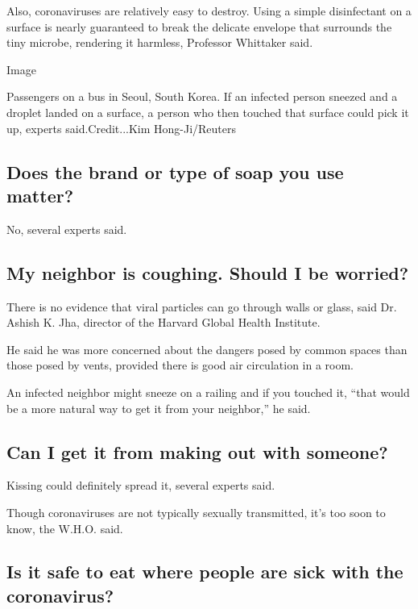 Also, coronaviruses are relatively easy to destroy. Using a simple
disinfectant on a surface is nearly guaranteed to break the delicate
envelope that surrounds the tiny microbe, rendering it harmless,
Professor Whittaker said.

Image

Passengers on a bus in Seoul, South Korea. If an infected person sneezed
and a droplet landed on a surface, a person who then touched that
surface could pick it up, experts said.Credit...Kim Hong-Ji/Reuters

\hypertarget{does-the-brand-or-type-of-soap-you-use-matter}{%
\subsection{Does the brand or type of soap you use
matter?}\label{does-the-brand-or-type-of-soap-you-use-matter}}

No, several experts said.

\hypertarget{my-neighbor-is-coughing-should-i-be-worried}{%
\subsection{My neighbor is coughing. Should I be
worried?}\label{my-neighbor-is-coughing-should-i-be-worried}}

There is no evidence that viral particles can go through walls or glass,
said Dr. Ashish K. Jha, director of the Harvard Global Health Institute.

He said he was more concerned about the dangers posed by common spaces
than those posed by vents, provided there is good air circulation in a
room.

An infected neighbor might sneeze on a railing and if you touched it,
``that would be a more natural way to get it from your neighbor,'' he
said.

\hypertarget{can-i-get-it-from-making-out-with-someone}{%
\subsection{Can I get it from making out with
someone?}\label{can-i-get-it-from-making-out-with-someone}}

Kissing could definitely spread it, several experts said.

Though coronaviruses are not typically sexually transmitted, it's too
soon to know, the W.H.O. said.

\hypertarget{is-it-safe-to-eat-where-people-are-sick-with-the-coronavirus}{%
\subsection{Is it safe to eat where people are sick with the
coronavirus?}\label{is-it-safe-to-eat-where-people-are-sick-with-the-coronavirus}}

